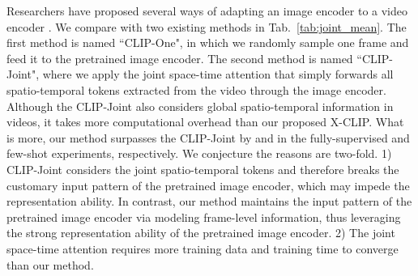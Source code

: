 \documentclass[runningheads]{llncs}
\begin{document}
Researchers have proposed several ways of adapting an image encoder to a video encoder \cite{arnab2021vivit,timesformer2021}. We compare with two existing methods in Tab.~\ref{tab:joint_mean}.  The first method is named ``CLIP-One", in which we randomly sample one frame and feed it to the pretrained image encoder. The second method is named ``CLIP-Joint", where we apply the joint space-time attention \cite{arnab2021vivit} that simply forwards all spatio-temporal tokens extracted from the video through the image encoder. Although the CLIP-Joint also considers global spatio-temporal information in videos, it takes more computational overhead than our proposed X-CLIP. What is more, our method surpasses the CLIP-Joint by  and  in the fully-supervised and few-shot experiments, respectively. We conjecture the reasons are two-fold. 1) CLIP-Joint considers the joint spatio-temporal tokens and therefore breaks the customary input pattern of the pretrained image encoder, which may impede the representation ability. In contrast, our method maintains the input pattern of the pretrained image encoder via modeling frame-level information, thus leveraging the strong representation ability of the pretrained image encoder. 2) The joint space-time attention requires more training data and training time to converge than our method. 
\end{document}
